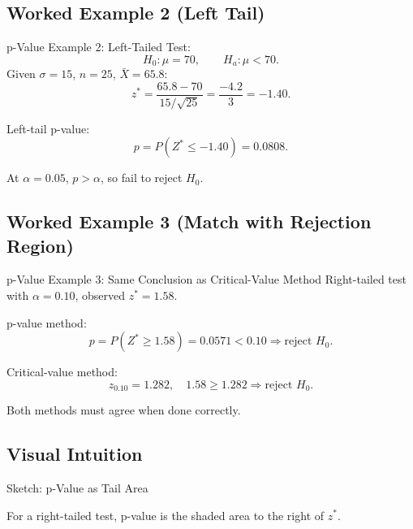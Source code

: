 \documentclass[aspectratio=169]{beamer}
\begin{document}
\subsection{Worked Example 2 (Left Tail)}
\begin{frame}{p-Value Example 2: Left-Tailed}
  Test:
  \[
    H_0:\mu=70,\qquad H_a:\mu<70.
  \]
  Given \(\sigma=15\), \(n=25\), \(\bar X=65.8\):
  \[
    z^*=\frac{65.8-70}{15/\sqrt{25}}=\frac{-4.2}{3}=-1.40.
  \]

  Left-tail p-value:
  \[
    p=P(Z^*\le -1.40)=0.0808.
  \]

  \vspace{1mm}
  At \(\alpha=0.05\), \(p>\alpha\), so fail to reject \(H_0\).
\end{frame}

\subsection{Worked Example 3 (Match with Rejection Region)}
\begin{frame}{p-Value Example 3: Same Conclusion as Critical-Value Method}
  Right-tailed test with \(\alpha=0.10\), observed \(z^*=1.58\).

  \vspace{1mm}
  p-value method:
  \[
    p=P(Z^*\ge 1.58)=0.0571<0.10\Rightarrow \text{reject }H_0.
  \]

  Critical-value method:
  \[
    z_{0.10}=1.282,
    \quad
    1.58\ge 1.282\Rightarrow \text{reject }H_0.
  \]

  \vspace{1mm}
  Both methods must agree when done correctly.
\end{frame}

\subsection{Visual Intuition}
\begin{frame}{Sketch: p-Value as Tail Area}
  \centering

  \vspace{1mm}
  For a right-tailed test, p-value is the shaded area to the right of \(z^*\).
\end{frame}
\end{document}
